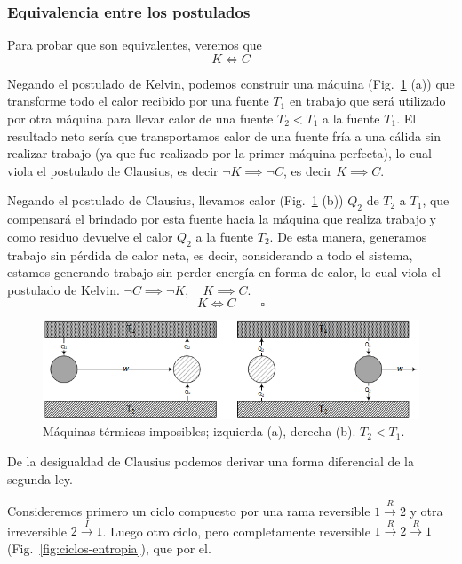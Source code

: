 \documentclass[openany]{book}
\begin{document}
\subsubsection{Equivalencia entre los postulados}
Para probar que son equivalentes, veremos que
\begin{equation*}
	K\Longleftrightarrow C
\end{equation*}
\par Negando el postulado de Kelvin, podemos construir una máquina (Fig.\ \ref{fig:maquinas-imposibles} (a)) que transforme todo el calor recibido por una fuente $T_1$ en trabajo que será utilizado por otra máquina para llevar calor de una fuente $T_2<T_1$ a la fuente $T_1$. El resultado neto sería que transportamos calor de una fuente fría a una cálida sin realizar trabajo (ya que fue realizado por la primer máquina perfecta), lo cual viola el postulado de Clausius, es decir $\lnot K\implies\lnot C$, es decir $K\implies C$.
\par Negando el postulado de Clausius, llevamos calor (Fig.\ \ref{fig:maquinas-imposibles} (b)) $Q_2$ de $T_2$ a $T_1$, que compensará el brindado por esta fuente hacia la máquina que realiza trabajo y como residuo devuelve el calor $Q_2$ a la fuente $T_2$. De esta manera, generamos trabajo sin pérdida de calor neta, es decir, considerando a todo el sistema, estamos generando trabajo sin perder energía en forma de calor, lo cual viola el postulado de Kelvin. $\lnot C\implies\lnot K,\quad K\implies C$.
\begin{equation*}
	K\Longleftrightarrow C \qquad \square
\end{equation*}

\begin{figure}[htb!]
	\centering
	\includegraphics[width=\textwidth]{img/enunciados-2ley.png}
	\caption{Máquinas térmicas imposibles; izquierda (a), derecha (b). $T_2<T_1$.}
	\label{fig:maquinas-imposibles}
\end{figure}

\par De la desigualdad de Clausius podemos derivar una forma diferencial de la segunda ley.
\par Consideremos primero un ciclo compuesto por una rama reversible $1\xrightarrow{R}2$ y otra irreversible $2\xrightarrow{I}1$. Luego otro ciclo, pero completamente reversible $1\xrightarrow{R}2\xrightarrow{R}1$ (Fig.\ \ref{fig:ciclos-entropia}), que por el.
\end{document}
